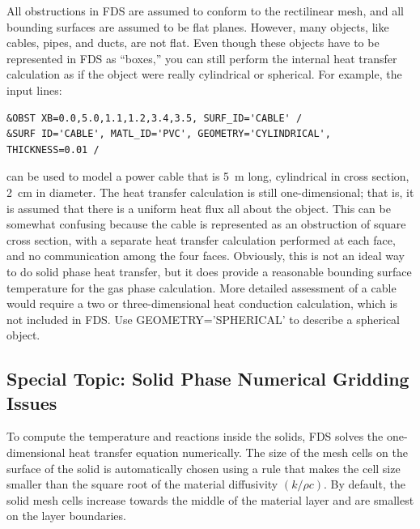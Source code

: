 \documentclass[11pt]{book}
\begin{document}
All obstructions in FDS are assumed to conform to the rectilinear
mesh, and all bounding surfaces are assumed to be flat
planes. However, many objects, like cables, pipes, and ducts, are not
flat. Even though these objects have to be represented in FDS as
``boxes,'' you can still perform the internal heat transfer
calculation as if the object were really cylindrical or spherical. For
example, the input lines:
\begin{lstlisting}
&OBST XB=0.0,5.0,1.1,1.2,3.4,3.5, SURF_ID='CABLE' /
&SURF ID='CABLE', MATL_ID='PVC', GEOMETRY='CYLINDRICAL', THICKNESS=0.01 /
\end{lstlisting}
can be used to model a power cable that is 5~m long, cylindrical in
cross section, 2~cm in diameter. The heat transfer calculation is
still one-dimensional; that is, it is assumed that there is a uniform
heat flux all about the object. This can be somewhat confusing because
the cable is represented as an obstruction of square cross section,
with a separate heat transfer calculation performed at each face, and
no communication among the four faces. Obviously, this is not an ideal
way to do solid phase heat transfer, but it does provide a reasonable
bounding surface temperature for the gas phase calculation. More
detailed assessment of a cable would require a two or
three-dimensional heat conduction calculation, which is not included
in FDS. Use {\ct GEOMETRY='SPHERICAL'} to describe a spherical object.


\subsection{Special Topic: Solid Phase Numerical Gridding Issues}
\label{info:solid_phase_stability}

To compute the temperature and reactions inside the solids, FDS solves
the one-dimensional heat transfer equation numerically. The size of
the mesh cells on the surface of the solid is automatically chosen
using a rule that makes the cell size smaller than the square root of
the material diffusivity $(k/\rho c)$. By default, the solid mesh
cells increase towards the middle of the material layer and are smallest
on the layer boundaries.
\end{document}
